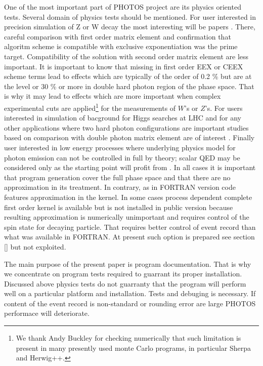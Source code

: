 \documentclass[]{Photos_interface_design}
\begin{document}
One of the most important part of PHOTOS project are its physics oriented tests.
Several domain
of physics tests should be mentioned. For user interested in precision 
simulation of Z or W decay the most interesting will be papers \cite{Nanava:2009vg,Golonka:2006tw}. There, careful comparison with first order matrix element 
and confirmation that algoritm scheme  is compatible with exclusive 
exponentiation was the prime target. Compatibility of the solution
with second order matrix element are less important. 
It is important to know that missing in first order EEX or CEEX \cite{koralz4:1994,kkcpc:1999} 
scheme terms
lead to effects which are typically of the order of 0.2 \% but are at the level 
or 30 \% or more in double hard photon region of the phase space. That is 
why it may lead to effects which are more important when complex experimental 
cuts are applied\footnote{We thank Andy Buckley for checking numerically
 that such limitation is present in many presently used monte Carlo programs,
in particular Sherpa and Herwig++.  } 
for the measurements of $W$'s or $Z$'s.
 For users interested in simulation of
bacground for Higgs searches at LHC and for any other applications where 
two hard photon configurations are important studies based on comparison with 
double photon matrix element are of 
interest \cite{Barberio:1993qi,RichterWas:1994ep,RichterWas:1993ta}.
Finally user interested in low energy processes where underlying physics model 
for photon emission can not be controlled in full by theory; scalar QED may 
be considered only as the starting point will profit 
from \cite{Nanava:2009vg,Nanava:2006vv}. In all cases it is important that
 program generation cover the full phase space and that there are no 
approximation in its treatment. In contrary, as in FORTRAN version code 
features approximation in the kernel. In some cases process dependent 
complete first order 
kernel is available but is not installed in public version  
because resulting approximation is 
numerically unimportant and requires control of the spin state for decaying 
particle. That requires better control of event record than what was available 
in FORTRAN. At present such option is prepared see section \ref{} but not exploited. 

The main purpose of the present paper is program documentation. That is why
we concentrate on program tests required to guarrant its proper installation.
Discussed above physics tests
do not guarranty that the program will perform well on a particular platform and installation. Tests and debuging
is necessary.  If content of the event record is non-standard or rounding error are large PHOTOS performace will deteriorate.
\end{document}
